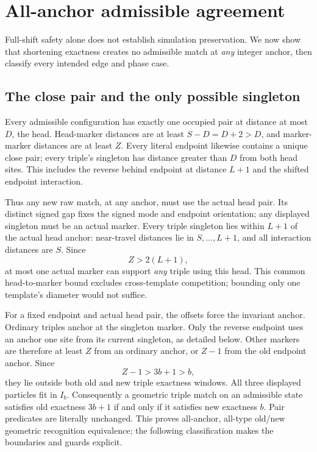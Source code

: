 \documentclass[11pt,a4paper]{article}
\numberwithin{equation}{section}
\begin{document}
\section{All-anchor admissible agreement}\label{fpa:sw:sec:geometry}
Full-shift safety alone does not establish simulation preservation. We now show that shortening exactness creates no admissible match at \emph{any} integer anchor, then classify every intended edge and phase case.

\subsection{The close pair and the only possible singleton}
Every admissible configuration has exactly one occupied pair at distance at most $D$, the head. Head-marker distances are at least $S-D=D+2>D$, and marker-marker distances are at least $Z$. Every literal endpoint likewise contains a unique close pair; every triple's singleton has distance greater than $D$ from both head sites. This includes the reverse behind endpoint at distance $L+1$ and the shifted endpoint interaction.

Thus any new raw match, at any anchor, must use the actual head pair. Its distinct signed gap fixes the signed mode and endpoint orientation; any displayed singleton must be an actual marker. Every triple singleton lies within $L+1$ of the actual head anchor: near-travel distances lie in $S,\ldots,L+1$, and all interaction distances are $S$. Since
\[
Z>2(L+1),
\]
at most one actual marker can support \emph{any} triple using this head. This common head-to-marker bound excludes cross-template competition; bounding only one template's diameter would not suffice.

For a fixed endpoint and actual head pair, the offsets force the invariant anchor. Ordinary triples anchor at the singleton marker. Only the reverse endpoint uses an anchor one site from its current singleton, as detailed below. Other markers are therefore at least $Z$ from an ordinary anchor, or $Z-1$ from the old endpoint anchor. Since
\[
Z-1>3b+1>b,
\]
they lie outside both old and new triple exactness windows. All three displayed particles fit in $I_b$. Consequently a geometric triple match on an admissible state satisfies old exactness $3b+1$ if and only if it satisfies new exactness $b$. Pair predicates are literally unchanged. This proves all-anchor, all-type old/new geometric recognition equivalence; the following classification makes the boundaries and guards explicit.
\end{document}
